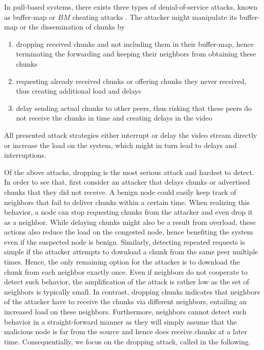In pull-based systems, there exists three types of denial-of-service attacks, known as buffer-map or $BM$ cheating attacks \cite{cheatingAnalysis}.  The attacker might manipulate its buffer-map or the dissemination of chunks by 
\begin{enumerate}
\item dropping received chunks and not including them in their buffer-map, hence terminating the forwarding and keeping their neighbors from obtaining these chunks  
\item requesting already received chunks or offering chunks they never received, thus creating additional load and delays
\item delay sending actual chunks to other peers, thus risking that these peers do not receive the chunks in time and creating delays in the video 
\end{enumerate}
All presented attack strategies either interrupt or delay the video stream directly or increase the load on the system, which might in turn lead to delays and interruptions. 

Of the above attacks, dropping is the most serious attack and hardest to detect.
In order to see that, first consider an attacker that delays chunks or advertised chunks that they did not receive. A benign node could easily keep track of neighbors that fail to deliver chunks within a certain time. When realizing this behavior, a node can stop requesting chunks from the attacker and even drop it as a neighbor. While delaying chunks might also be a result from overload, these actions also reduce the load on the congested node, hence benefiting the system even if the suspected node is benign. 
Similarly, detecting repeated requests is simple if the attacker attempts to download a chunk from the same peer multiple times. Hence, the only remaining option for the attacker is to download the chunk from each neighbor exactly once. Even if neighbors do not cooperate to detect such behavior, the amplification of the attack is rather low as the set of neighbors is typically small. 
In contrast, dropping chunks indicates that neighbors of the attacker have to receive the chunks via different neighbors, entailing an increased  load on these neighbors. Furthermore, neighbors cannot detect such behavior in a straight-forward manner as they will simply assume that the malicious node is far from the source and hence does receive chunks at a later time. 
Consequentially, we focus on the dropping attack, called \drop in the following. 


